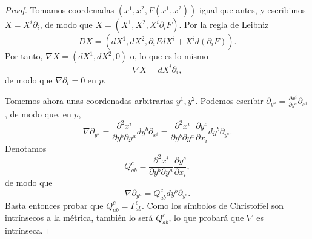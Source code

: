 \documentclass[11pt,a4paper]{amsbook}
\theoremstyle{remark} \newtheorem{rmk}[subsection]{Observación}
\theoremstyle{definition} \newtheorem{defn}[subsection]{Definición}
\theoremstyle{definition} \newtheorem{ex}[subsection]{Ejemplo}
\theoremstyle{definition} \newtheorem{ej}[subsection]{Ejercicio}
\begin{document}
\begin{proof}
  Tomamos coordenadas $(x^1,x^2,F(x^1,x^2))$ igual que antes, y escribimos $X=X^i\partial_i$, de modo que $X=(X^1,X^2,X^i\partial_i F)$. Por la regla de Leibniz
  \begin{equation*}
D X = (dX^1, dX^2, \partial_i F dX^i + X^i d(\partial_iF)).
  \end{equation*}
  Por tanto, $\nabla X = (dX^1,dX^2,0)$ o, lo que es lo mismo
  \begin{equation*}
\nabla X = dX^i \partial_i,
  \end{equation*}
  de modo que $\nabla \partial_i = 0$ en $p$.

  Tomemos ahora unas coordenadas arbitrarias $y^1, y^2$. Podemos escribir $\partial_{y^a}=\frac{\partial x^i}{\partial y^a} \partial_{x^i}$, de modo que, en $p$,
  \begin{equation*}
\nabla \partial_{y^a} = \frac{\partial^2 x^i}{\partial y^b \partial y^a} dy^b \partial_{x^i} = \frac{\partial^2 x^i}{\partial y^b \partial y^a} \frac{\partial y^c}{\partial x_i}dy^b \partial_{y^c}.
  \end{equation*}
  Denotamos
  \begin{equation*}
Q^c_{ab} = \frac{\partial^2 x^i}{\partial y^b \partial y^a} \frac{\partial y^c}{\partial x_i},
  \end{equation*}
  de modo que
  \begin{equation*}
\nabla \partial_{y^a} = Q^c_{ab} dy^b \partial_{y^c}.
  \end{equation*}
Basta entonces probar que $Q^c_{ab}=\Gamma^c_{ab}$. Como los símbolos de Christoffel son intrínsecos a la métrica, también lo será $Q^c_{ab}$, lo que probará que $\nabla$ es intrínseca.


\end{proof}
\end{document}
